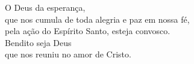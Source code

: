 O Deus da esperança, \\ que nos cumula de toda alegria e paz em nossa fé, \\ pela ação do Espírito Santo, esteja convosco. \\
\RbarRed{} Bendito seja Deus \\ que nos reuniu no amor de Cristo.
\vspace{.2cm} \\
